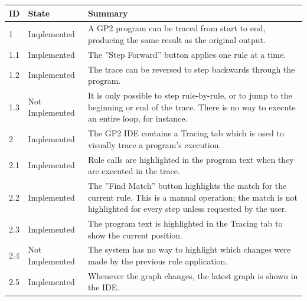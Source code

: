 \documentclass[authoryearcitations]{UoYCSproject}
\begin{document}
\begin{table}[!htb]
    \begin{tabularx}{\linewidth}{|l|l|X|}
        \hline
        \textbf{ID} & \textbf{State} & \textbf{Summary} \\ \hline
        1    &  Implemented     & A GP2 program can be traced from start to end, producing
                                  the same result as the original output. \\ \hline
        1.1  &  Implemented     & The ''Step Forward'' button applies one rule at a time. \\ \hline
        1.2  &  Implemented     & The trace can be reversed to step backwards through the
                                  program. \\ \hline
        1.3  &  Not Implemented & It is only possible to step rule-by-rule, or to jump to
                                  the beginning or end of the trace. There is no way to
                                  execute an entire loop, for instance. \\ \hline

        2    &  Implemented     & The GP2 IDE contains a Tracing tab which is used to
                                  visually trace a program's execution. \\ \hline
        2.1  &  Implemented     & Rule calls are highlighted in the program text when they
                                  are executed in the trace. \\ \hline
        2.2  &  Implemented     & The ''Find Match'' button highlights the match for the
                                  current rule. This is a manual operation; the
                                  match is not highlighted for every step unless requested
                                  by the user. \\ \hline
        2.3  &  Implemented     & The program text is highlighted in the Tracing tab to
                                  show the current position. \\ \hline
        2.4  &  Not Implemented & The system has no way to highlight which changes were made
                                  by the previous rule application. \\ \hline
        2.5  &  Implemented     & Whenever the graph changes, the latest graph is shown in
                                  the IDE. \\ \hline


\end{tabularx}
\end{table}
\end{document}

